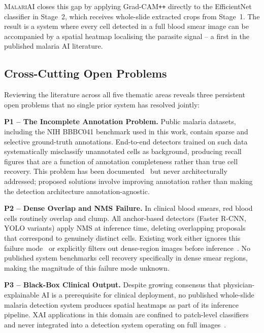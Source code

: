 \documentclass[10pt,twocolumn]{article}
\newcommand{\malariai}{\textsc{MalariAI}}
\begin{document}
\malariai{} closes this gap by applying Grad-CAM\texttt{++} directly
to the EfficientNet classifier in Stage~2, which receives whole-slide
extracted crops from Stage~1. The result is a system where every
cell detected in a full blood smear image can be accompanied by a
spatial heatmap localising the parasite signal -- a first in the
published malaria AI literature.

\subsection{Cross-Cutting Open Problems}
\label{ssec:gaps}

Reviewing the literature across all five thematic areas reveals three
persistent open problems that no single prior system has resolved jointly:

\textbf{P1 -- The Incomplete Annotation Problem.} Public malaria datasets,
including the NIH BBBC041 benchmark used in this work, contain sparse and
selective ground-truth annotations. End-to-end detectors trained on such
data systematically misclassify unannotated cells as background, producing
recall figures that are a function of annotation completeness rather than
true cell recovery. This problem has been documented~\cite{loh2021,coco_dataset2025}
but never architecturally addressed; proposed solutions involve improving
annotation rather than making the detection architecture annotation-agnostic.

\textbf{P2 -- Dense Overlap and NMS Failure.} In clinical blood smears,
red blood cells routinely overlap and clump. All anchor-based detectors
(Faster R-CNN, YOLO variants) apply NMS at inference time, deleting
overlapping proposals that correspond to genuinely distinct cells.
Existing work either ignores this failure mode~\cite{singh2025,yolov4malaria2024}
or explicitly filters out dense-region images before inference~\cite{loh2021}.
No published system benchmarks cell recovery specifically in dense smear
regions, making the magnitude of this failure mode unknown.

\textbf{P3 -- Black-Box Clinical Output.} Despite growing consensus
that physician-explainable AI is a prerequisite for clinical deployment,
no published whole-slide malaria detection system produces spatial
heatmaps as part of its inference pipeline. XAI applications in this
domain are confined to patch-level classifiers and never integrated
into a detection system operating on full images~\cite{singh2025,trustworthy2025}.
\end{document}
